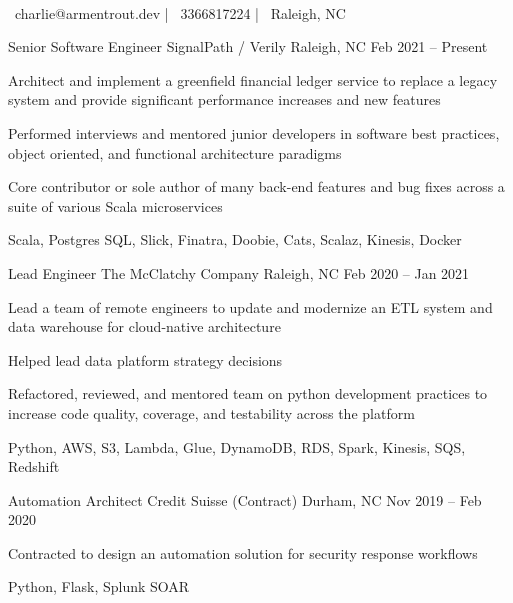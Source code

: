 \documentclass[]{awesome-cv}
\begin{document}
\begin{center}
	 \\
	\vspace{1mm}
	{\faEnvelope\ charlie@armentrout.dev} | {\faMobile\ 3366817224} | {\faMapMarker\ Raleigh, NC}
\end{center}
\begin{cventries}
	\cventry
	{Senior Software Engineer}
	{SignalPath / Verily}
	{Raleigh, NC}
	{Feb 2021 – Present}
	{\begin{cvitems}
		\item {Architect and implement a greenfield financial ledger service to replace a legacy system and provide significant performance increases and new features}
		\item {Performed interviews and mentored junior developers in software best practices, object oriented, and functional architecture paradigms}
		\item {Core contributor or sole author of many back-end features and bug fixes across a suite of various Scala microservices}
		\item {Scala, Postgres SQL, Slick, Finatra, Doobie, Cats, Scalaz, Kinesis, Docker}
		\end{cvitems}}
	\cventry
	{Lead Engineer}
	{The McClatchy Company}
	{Raleigh, NC}
	{Feb 2020 – Jan 2021}
	{\begin{cvitems}
		\item {Lead a team of remote engineers to update and modernize an ETL system and data warehouse for cloud-native architecture}
		\item {Helped lead data platform strategy decisions}
		\item {Refactored, reviewed, and mentored team on python development practices to increase code quality, coverage, and testability across the platform}
		\item {Python, AWS, S3, Lambda, Glue, DynamoDB, RDS, Spark, Kinesis, SQS, Redshift}
		\end{cvitems}}
	\cventry
	{Automation Architect}
	{Credit Suisse (Contract)}
	{Durham, NC}
	{Nov 2019 – Feb 2020}
	{\begin{cvitems}
		\item {Contracted to design an automation solution for security response workflows}
		\item {Python, Flask, Splunk SOAR}

\end{cvitems}}
\end{cventries}
\end{document}
